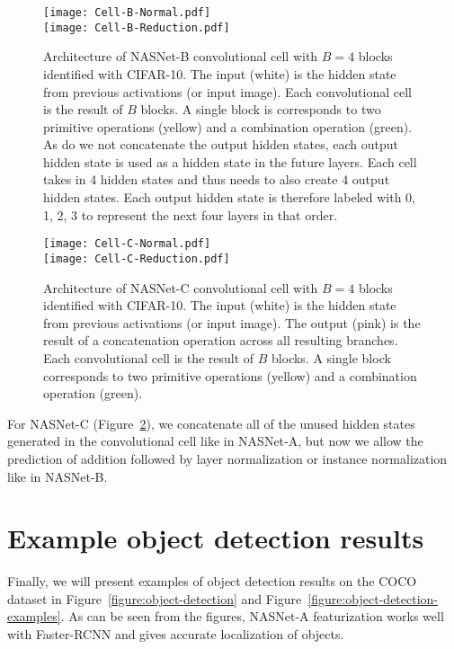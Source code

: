 \documentclass[10pt,twocolumn,letterpaper]{article}
\begin{document}
\begin{figure}[h!]
\begin{center}
\texttt{[image: Cell-B-Normal.pdf]} \\
\vspace{0.4cm}
\texttt{[image: Cell-B-Reduction.pdf]}
\caption{Architecture of NASNet-B convolutional cell with $B=4$ blocks identified with CIFAR-10. The input (white) is the hidden state from previous activations (or input image).
Each convolutional cell is the result of $B$ blocks.
A single block is corresponds to two primitive operations (yellow) and a combination operation (green). As do we not concatenate the output hidden states, each output hidden state is used as a hidden state in the future layers. Each cell takes in 4 hidden states and thus needs to also create 4 output hidden states. Each output hidden state is therefore labeled with 0, 1, 2, 3 to represent the next four layers in that order.
}
\label{figure:cell_structure_b}
\end{center}
\end{figure}\begin{figure}[h!]
\begin{center}
\texttt{[image: Cell-C-Normal.pdf]} \\
\vspace{0.4cm}
\texttt{[image: Cell-C-Reduction.pdf]}
\caption{Architecture of NASNet-C convolutional cell with $B=4$ blocks identified with CIFAR-10. The input (white) is the hidden state from previous activations (or input image). The output (pink) is the result of a concatenation operation across all resulting branches.
Each convolutional cell is the result of $B$ blocks.
A single block corresponds to two primitive operations (yellow) and a combination operation (green). 
}
\label{figure:cell_structure_c}
\end{center}
\end{figure}

For NASNet-C (Figure~\ref{figure:cell_structure_c}), we concatenate all of the unused hidden states generated in the convolutional cell like in NASNet-A, but now we allow the prediction of addition followed by layer normalization or instance normalization like in NASNet-B.

\section{Example object detection results}\label{sec:object_detection}
Finally, we will present examples of object detection results on the COCO dataset in  Figure~\ref{figure:object-detection} and Figure~\ref{figure:object-detection-examples}. As can be seen from the figures, NASNet-A featurization works well with Faster-RCNN and gives accurate localization of objects.
\end{document}
